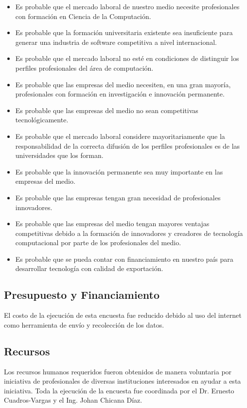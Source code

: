 \begin{itemize}
 \item Es probable que el mercado laboral de nuestro medio necesite profesionales con formación en Ciencia de la Computación.
\item Es probable que la formación universitaria existente sea insuficiente para generar una industria de software competitiva a nivel internacional.
\item Es probable que el mercado laboral no esté en condiciones de distinguir los perfiles profesionales del área de computación.
\item Es probable que las empresas del medio necesiten, en una gran mayoría, profesionales con formación en investigación e innovación permanente.
\item Es probable que las empresas del medio no sean competitivas tecnológicamente.
\item Es probable que el mercado laboral considere mayoritariamente que la responsabilidad de la correcta difusión de los perfiles profesionales es de las universidades que los forman.
\item Es probable que la innovación permanente sea muy importante en las empresas del medio.
\item Es probable que las empresas tengan gran necesidad de profesionales innovadores.
\item Es probable que las empresas del medio tengan mayores ventajas competitivas debido a la formación de innovadores y creadores de tecnología computacional por parte de los profesionales del medio.
\item Es probable que se pueda contar con financiamiento en nuestro país para desarrollar tecnología con calidad de exportación.
\end{itemize}


\subsection{Presupuesto y Financiamiento}
El costo de la ejecución de esta encuesta fue reducido debido al uso del internet como herramienta de envío y recolección de los datos. 

\subsection{Recursos}
Los recursos humanos requeridos fueron obtenidos de manera voluntaria por iniciativa de profesionales de diversas instituciones interesados en ayudar a esta iniciativa. Toda la ejecución de la encuesta fue coordinada por el Dr. Ernesto Cuadros-Vargas y el Ing. Johan Chicana Díaz.

